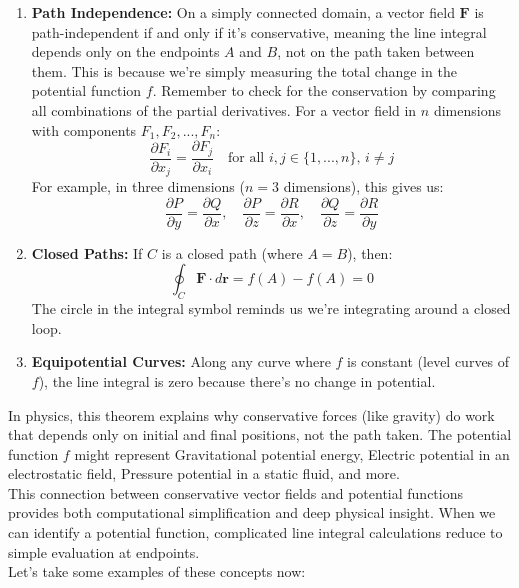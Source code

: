 \begin{enumerate}
\item \textbf{Path Independence:} On a simply connected domain, a vector field $\mathbf{F}$ is path-independent if and only if it's conservative, meaning the line integral depends only on the endpoints $A$ and $B$, not on the path taken between them. This is because we're simply measuring the total change in the potential function $f$. Remember to check for the conservation by comparing all combinations of the partial derivatives. For a vector field in $n$ dimensions with components $F_1, F_2, ..., F_n$:
\[
\frac{\partial F_i}{\partial x_j} = \frac{\partial F_j}{\partial x_i} \quad \text{for all } i,j \in \{1,...,n\}, \, i \neq j
\]
For example, in three dimensions ($n=3$ dimensions), this gives us:
\[
\frac{\partial P}{\partial y} = \frac{\partial Q}{\partial x}, \quad
\frac{\partial P}{\partial z} = \frac{\partial R}{\partial x}, \quad
\frac{\partial Q}{\partial z} = \frac{\partial R}{\partial y}
\]

    \item \textbf{Closed Paths:} If $C$ is a closed path (where $A=B$), then:
    \[
    \oint_C \mathbf{F} \cdot d\mathbf{r} = f(A) - f(A) = 0
    \]
    The circle in the integral symbol reminds us we're integrating around a closed loop.
    
    \item \textbf{Equipotential Curves:} Along any curve where $f$ is constant (level curves of $f$), the line integral is zero because there's no change in potential.
\end{enumerate}

\noindent In physics, this theorem explains why conservative forces (like gravity) do work that depends only on initial and final positions, not the path taken. The potential function $f$ might represent Gravitational potential energy, Electric potential in an electrostatic field, Pressure potential in a static fluid, and more. \\

\noindent This connection between conservative vector fields and potential functions provides both computational simplification and deep physical insight. When we can identify a potential function, complicated line integral calculations reduce to simple evaluation at endpoints. \\

\noindent Let's take some examples of these concepts now:

